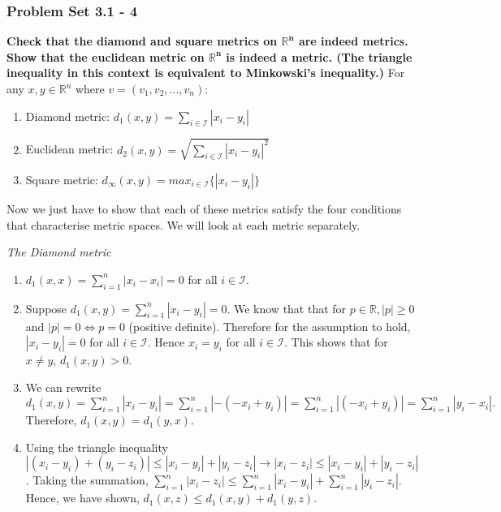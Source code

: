 \begin{frame}
\frametitle{Problem Set 3.1 - 4}
\textbf{Check that the diamond and square metrics on $\bm{\mathbb{R}^n}$ are
indeed metrics. Show that the euclidean metric on $\bm{\mathbb{R}^n}$ is indeed
a metric. (The triangle inequality in this context is equivalent to Minkowski’s
inequality.)}\hfill\break
\hfill\break
For any $x, y \in \mathbb{R}^n $ where $v = (v_1, v_2,...,v_n)$: 
\begin{enumerate}
    \item Diamond metric: $d_1(x,y) = \sum_{i\in \mathcal{I}} |x_i - y_i| $
    \item Euclidean metric: $d_2(x,y) = \sqrt{\sum_{i\in \mathcal{I}} |x_i -
    y_i|^2} $
    \item Square metric: $d_{\infty}(x,y) = max_{i\in \mathcal{I}}\{|x_i -
    y_i|\}$
\end{enumerate}
\hfill\break
Now we just have to show that each of these metrics satisfy the four conditions
that characterise metric spaces. We will look at each metric separately.
\end{frame}

\begin{frame}
\textit{The Diamond metric}\hfill\break
\begin{enumerate}
    \item $d_1(x,x) = \sum_{i=1}^{n} |x_i - x_i| = 0$ for all $i\in
    \mathcal{I}.$
    \item Suppose $d_1(x,y) = \sum_{i=1}^{n} |x_i - y_i| = 0$. We know that that
    for $p \in \mathbb{R}, |p|\geq 0$ and $|p| = 0 \iff p = 0$ (positive
    definite). Therefore for the assumption to hold, $|x_i - y_i| = 0$ for all
    $i \in \mathcal{I}$. Hence $x_i = y_i$ for all $i \in \mathcal{I}$. This
    shows that for $x\neq y$, $d_1(x,y)>0$.
    \item We can rewrite $d_1(x,y) = \sum_{i=1}^{n} |x_i - y_i| = \sum_{i=1}^{n}
    |- (- x_i + y_i)| = \sum_{i=1}^{n} |(- x_i + y_i)| = \sum_{i=1}^{n} |y_i -
    x_i |.$ Therefore, $d_1(x,y) = d_1(y,x).$
    \item Using the triangle inequality $|(x_i - y_i) + (y_i - z_i)| \leq |x_i -
    y_i| + |y_i - z_i| \rightarrow |x_i - z_i| \leq |x_i - y_i| + |y_i - z_i|$.
    Taking the summation, $\sum_{i=1}^{n}|x_i - z_i| \leq \sum_{i=1}^{n}|x_i -
    y_i| + \sum_{i=1}^{n}|y_i - z_i|$. Hence, we have shown, $d_1(x,z) \leq
    d_1(x,y)+d_1(y,z).$
\end{enumerate}
\end{frame}

